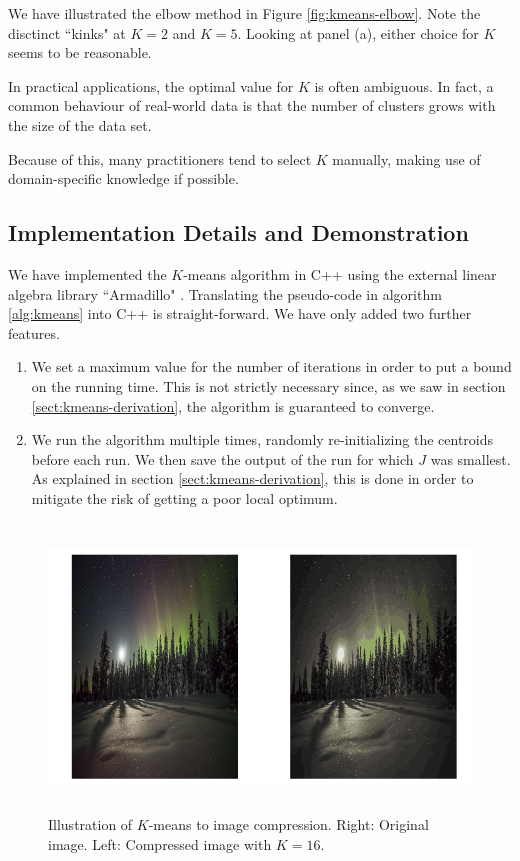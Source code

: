 \documentclass[final,3p,times,twocolumn]{elsarticle}
\begin{document}
We have illustrated the elbow method in Figure \ref{fig:kmeans-elbow}.
Note the disctinct ``kinks" at $K=2$ and $K=5$.
Looking at panel (a), either choice for $K$ seems to be reasonable.

In practical applications, the optimal value for $K$ is often ambiguous.
In fact, a common behaviour of real-world data is that the number of clusters grows with the size of the data set.

Because of this, many practitioners tend to select $K$ manually, making use of domain-specific knowledge if possible.


\subsection{Implementation Details and Demonstration}
\label{sect:kmeans-code}
We have implemented the $K$-means algorithm in C++ using the external linear algebra library ``Armadillo" \cite{armadillo}.
Translating the pseudo-code in algorithm \ref{alg:kmeans} into C++ is straight-forward.
We have only added two further features.
\begin{enumerate}
\item We set a maximum value for the number of iterations in order to put a bound on the running time.
This is not strictly necessary since, as we saw in section \ref{sect:kmeans-derivation}, the algorithm is guaranteed to converge.
\item We run the algorithm multiple times, randomly re-initializing the centroids before each run.
We then save the output of the run for which $J$ was smallest.
As explained in section \ref{sect:kmeans-derivation}, this is done in order to mitigate the risk of getting a poor local optimum.
\end{enumerate}

\begin{figure}
\centering
\includegraphics[width=\textwidth,height=3in]{polar.png}
\caption{Illustration of $K$-means to image compression. Right: Original image. Left: Compressed image with $K=16$.}
\label{fig:kmeans-image}
\end{figure}
\end{document}
